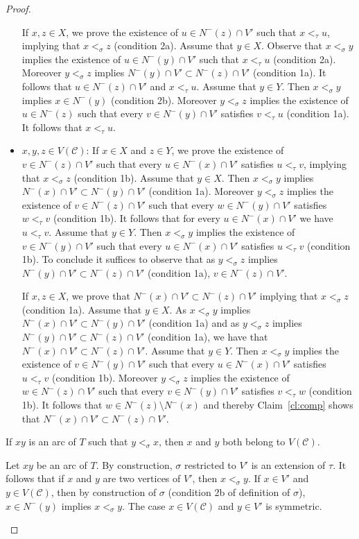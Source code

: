 \begin{proof}
\begin{proofclaim}
\begin{itemize}
If $x,z\in X$, we prove the existence of $u\in N^-(z)\cap V'$ such that $x<_{\tau} u$, implying that $x<_{\sigma} z$ (condition 2a). Assume that $y\in X$. Observe that $x<_{\sigma} y$ implies the existence of $u\in N^-(y)\cap V'$ such that $x<_{\tau} u$ (condition 2a). Moreover $y<_{\sigma} z$ implies $N^-(y)\cap V'\subset N^-(z)\cap V'$ (condition 1a). It follows that $u\in N^-(z)\cap V'$ and $x<_{\tau} u$. Assume that $y\in Y$. Then $x<_{\sigma} y$ implies $x\in N^-(y)$ (condition 2b). Moreover $y<_{\sigma} z$ implies the existence of $u\in N^-(z)$ such that every $v\in N^-(y)\cap V'$ satisfies $v<_{\tau} u$ (condition 1a). It follows that  $x<_{\tau} u$.


\item $x,y,z\in V(\mathcal{C})$: If  $x\in X$ and $z\in Y$, we prove the existence of $v\in N^-(z)\cap V'$ such that every $u\in N^-(x)\cap V'$ satisfies $u<_{\tau} v$, implying that $x<_{\sigma} z$ (condition 1b). Assume that $y\in X$. Then $x<_{\sigma} y$ implies $N^-(x)\cap V'\subset N^-(y)\cap V'$ (condition 1a). Moreover $y<_{\sigma} z$ implies the existence of $v\in N^-(z)\cap V'$ such that every $w\in N^-(y)\cap V'$ satisfies $w<_{\tau} v$ (condition 1b). It follows that for every $u\in N^-(x)\cap V'$ we have $u<_{\tau} v$. Assume that $y\in Y$. Then $x<_{\sigma} y$ implies the existence of $v\in N^-(y)\cap V'$ such that every $u\in N^-(x)\cap V'$ satisfies $u<_{\tau} v$ (condition 1b). To conclude it suffices to observe that as $y<_{\sigma} z$ implies $N^-(y)\cap V'\subset N^-(z)\cap V'$ (condition 1a), $v\in N^-(z)\cap V'$.


If $x,z\in X$, we prove that $N^-(x)\cap V'\subset N^-(z)\cap V'$ implying that $x<_{\sigma} z$ (condition 1a). Assume that $y\in X$. As $x<_{\sigma} y$ implies $N^-(x)\cap V'\subset N^-(y)\cap V'$ (condition 1a) and  as $y<_{\sigma} z$ implies  $N^-(y)\cap V'\subset N^-(z)\cap V'$ (condition 1a), we have that $N^-(x)\cap V'\subset N^-(z)\cap V'$. Assume that $y\in Y$. Then $x<_{\sigma} y$ implies the existence of $v\in N^-(y)\cap V'$ such that every $u\in N^-(x)\cap V'$ satisfies $u<_{\tau} v$ (condition 1b). Moreover $y<_{\sigma} z$ implies the existence of $w\in N^-(z)\cap V'$ such that every $v\in N^-(y)\cap V'$ satisfies $v<_{\tau} w$ (condition 1b). It follows that $w\in N^-(z)\setminus N^-(x)$ and thereby Claim~\ref{cl:comp} shows that $N^-(x)\cap V'\subset N^-(z)\cap V'$.
\end{itemize} \end{proofclaim}

\begin{claim} 
If $xy$ is an arc of $T$ such that $y<_{\sigma} x$, then $x$ and $y$ both belong to $V(\mathcal{C})$.
\end{claim}
\begin{proofclaim}
Let $xy$ be an arc of $T$. By construction, $\sigma$ restricted to $V'$ is an extension of $\tau$. 
It follows that if $x$ and $y$ are two vertices of $V'$, then $x<_{\sigma} y$. If $x\in V'$ and $y\in V(\mathcal{C})$, then by construction of $\sigma$ (condition 2b of definition of $\sigma$), $x\in N^-(y)$ implies $x<_{\sigma} y$. The case $x\in V(\mathcal{C})$ and $y\in V'$ is symmetric.
\end{proofclaim}


\end{proof}

